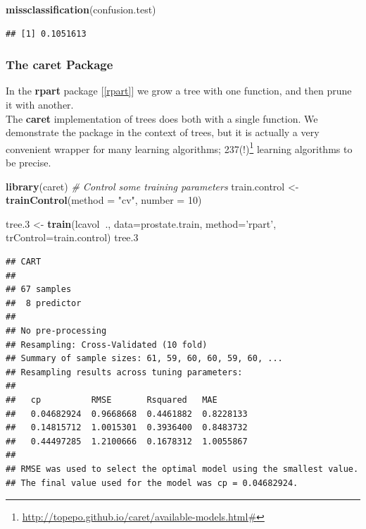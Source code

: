 \documentclass[]{book}
\newenvironment{Shaded}{\begin{snugshade}}{\end{snugshade}}
\newcommand{\CommentTok}[1]{\textcolor[rgb]{0.56,0.35,0.01}{\textit{#1}}}
\newcommand{\DataTypeTok}[1]{\textcolor[rgb]{0.13,0.29,0.53}{#1}}
\newcommand{\DecValTok}[1]{\textcolor[rgb]{0.00,0.00,0.81}{#1}}
\newcommand{\FloatTok}[1]{\textcolor[rgb]{0.00,0.00,0.81}{#1}}
\newcommand{\KeywordTok}[1]{\textcolor[rgb]{0.13,0.29,0.53}{\textbf{#1}}}
\newcommand{\NormalTok}[1]{#1}
\newcommand{\OperatorTok}[1]{\textcolor[rgb]{0.81,0.36,0.00}{\textbf{#1}}}
\newcommand{\StringTok}[1]{\textcolor[rgb]{0.31,0.60,0.02}{#1}}
\renewcommand{\href}[2]{#2\footnote{\url{#1}}}
\theoremstyle{definition}
\theoremstyle{definition}
\theoremstyle{definition}
\theoremstyle{remark}
\begin{document}
\begin{Shaded}
\begin{Highlighting}[]
\KeywordTok{missclassification}\NormalTok{(confusion.test)}
\end{Highlighting}
\end{Shaded}

\begin{verbatim}
## [1] 0.1051613
\end{verbatim}

\hypertarget{caret}{%
\subsubsection{The caret Package}\label{caret}}

In the \textbf{rpart} package {[}\ref{rpart}{]} we grow a tree with one function, and then prune it with another.\\
The \textbf{caret} implementation of trees does both with a single function.
We demonstrate the package in the context of trees, but it is actually a very convenient wrapper for many learning algorithms; \href{http://topepo.github.io/caret/available-models.html\#}{237(!)}
learning algorithms to be precise.

\begin{Shaded}
\begin{Highlighting}[]
\KeywordTok{library}\NormalTok{(caret)}
\CommentTok{# Control some training parameters}
\NormalTok{train.control <-}\StringTok{ }\KeywordTok{trainControl}\NormalTok{(}\DataTypeTok{method =} \StringTok{"cv"}\NormalTok{,}
                           \DataTypeTok{number =} \DecValTok{10}\NormalTok{)}

\NormalTok{tree}\FloatTok{.3}\NormalTok{ <-}\StringTok{ }\KeywordTok{train}\NormalTok{(lcavol}\OperatorTok{~}\NormalTok{., }\DataTypeTok{data=}\NormalTok{prostate.train, }
                \DataTypeTok{method=}\StringTok{'rpart'}\NormalTok{, }
                \DataTypeTok{trControl=}\NormalTok{train.control)}
\NormalTok{tree}\FloatTok{.3}
\end{Highlighting}
\end{Shaded}

\begin{verbatim}
## CART 
## 
## 67 samples
##  8 predictor
## 
## No pre-processing
## Resampling: Cross-Validated (10 fold) 
## Summary of sample sizes: 61, 59, 60, 60, 59, 60, ... 
## Resampling results across tuning parameters:
## 
##   cp          RMSE       Rsquared   MAE      
##   0.04682924  0.9668668  0.4461882  0.8228133
##   0.14815712  1.0015301  0.3936400  0.8483732
##   0.44497285  1.2100666  0.1678312  1.0055867
## 
## RMSE was used to select the optimal model using the smallest value.
## The final value used for the model was cp = 0.04682924.
\end{verbatim}
\end{document}
